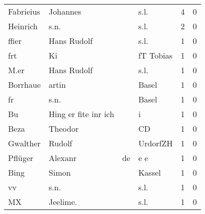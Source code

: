 \begin{tabular}{llllrr}
                Fabrieius &                           Johannes &             &                                        s.l. &          4 &         0 \\
                 Heinrich &                               s.n. &             &                                        s.l. &          2 &         0 \\
                    ffier &                        Hans Rudolf &             &                                        s.l. &          1 &         0 \\
                      frt &                                 Ki &             &                                   fT Tobias &          1 &         0 \\
                     M.er &                        Hans Rudolf &             &                                        s.l. &          1 &         0 \\
                 Borrhaue &                              artin &             &                                       Basel &          1 &         0 \\
                       fr &                               s.n. &             &                                       Basel &          1 &         0 \\
                       Bu &               Hing er fite inr ich &             &                                           i &          1 &         0 \\
                     Beza &                            Theodor &             &                                          CD &          1 &         0 \\
                 Gwalther &                             Rudolf &             &                                    UrdorfZH &          1 &         0 \\
                  Pflüger &                            Alexanr &          de &                                         e e &          1 &         0 \\
                     Bing &                              Simon &             &                                      Kassel &          1 &         0 \\
                       vv &                               s.n. &             &                                        s.l. &          1 &         0 \\
                       MX &                           Jeelime. &             &                                        s.l. &          1 &         0 \\

\end{tabular}
